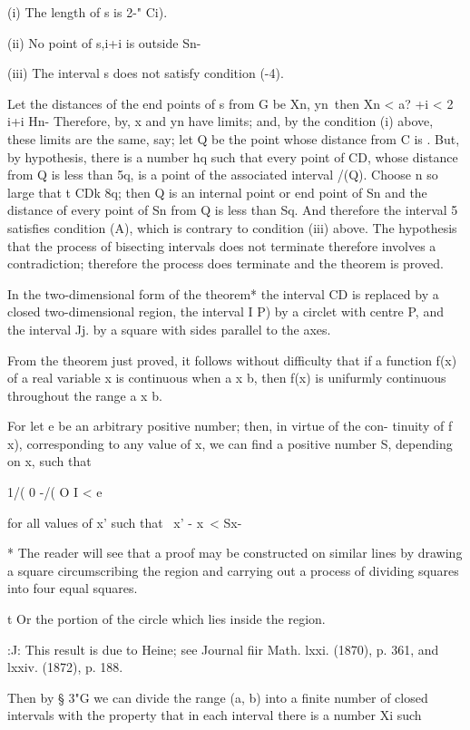 (i) The length of s is 2-" Ci).

(ii) No point of s,i+i is outside Sn-

(iii) The interval s does not satisfy condition (-4).

Let the distances of the end points of s from G be Xn, yn\ then Xn <
a? +i < 2 i+i Hn- Therefore, by, x and yn have limits; and, by
the condition (i) above, these limits are the same, say; let Q be the
point whose distance from C is . But, by hypothesis, there is a number
hq such that every point of CD, whose distance from Q is less than 5q,
is a point of the associated interval /(Q). Choose n so large that t
CDk 8q; then Q is an internal point or end point of Sn and the
distance of every point of Sn from Q is less than Sq. And therefore
the interval 5 satisfies condition (A), which is contrary to condition
(iii) above. The hypothesis that the process of bisecting intervals
does not terminate therefore involves a contradiction; therefore the
process does terminate and the theorem is proved.

In the two-dimensional form of the theorem* the interval CD is
replaced by a closed two-dimensional region, the interval I P) by a
circlet with centre P, and the interval Jj. by a square with sides
parallel to the axes.


From the theorem just proved, it follows without difficulty that if a
function f(x) of a real variable x is continuous when a x b, then f(x)
is unifurmly continuous throughout the range a x b.

For let e be an arbitrary positive number; then, in virtue of the
con- tinuity of f x), corresponding to any value of x, we can find a
positive number S, depending on x, such that

1/( 0 -/( O I < e

for all values of x' such that \ x' - x\ < Sx-

* The reader will see that a proof may be constructed on similar lines
by drawing a square circumscribing the region and carrying out a
process of dividing squares into four equal squares.

t Or the portion of the circle which lies inside the region.

:J: This result is due to Heine; see Journal fiir Math. lxxi. (1870),
p. 361, and lxxiv. (1872), p. 188.

%
%

Then by § 3"G we can divide the range (a, b) into a finite number of
closed intervals with the property that in each interval there is a
number Xi such

